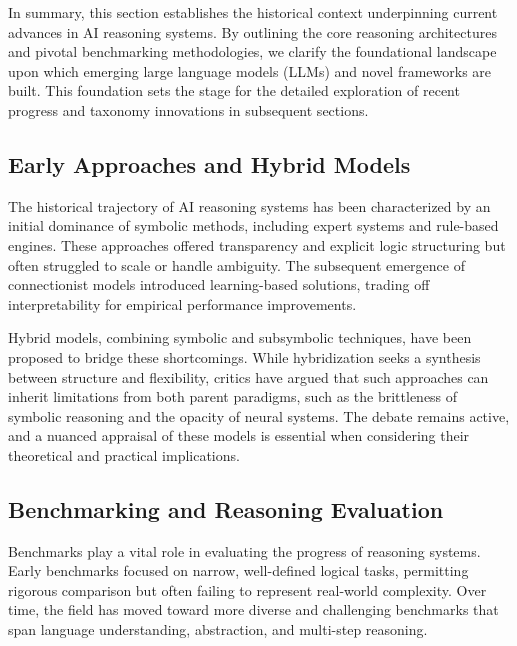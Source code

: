 \documentclass[sigconf]{acmart}
\begin{document}
In summary, this section establishes the historical context underpinning current advances in AI reasoning systems. By outlining the core reasoning architectures and pivotal benchmarking methodologies, we clarify the foundational landscape upon which emerging large language models (LLMs) and novel frameworks are built. This foundation sets the stage for the detailed exploration of recent progress and taxonomy innovations in subsequent sections.

\subsection{Early Approaches and Hybrid Models}
The historical trajectory of AI reasoning systems has been characterized by an initial dominance of symbolic methods, including expert systems and rule-based engines. These approaches offered transparency and explicit logic structuring but often struggled to scale or handle ambiguity. The subsequent emergence of connectionist models introduced learning-based solutions, trading off interpretability for empirical performance improvements.

Hybrid models, combining symbolic and subsymbolic techniques, have been proposed to bridge these shortcomings. While hybridization seeks a synthesis between structure and flexibility, critics have argued that such approaches can inherit limitations from both parent paradigms, such as the brittleness of symbolic reasoning and the opacity of neural systems. The debate remains active, and a nuanced appraisal of these models is essential when considering their theoretical and practical implications.

\subsection{Benchmarking and Reasoning Evaluation}
Benchmarks play a vital role in evaluating the progress of reasoning systems. Early benchmarks focused on narrow, well-defined logical tasks, permitting rigorous comparison but often failing to represent real-world complexity. Over time, the field has moved toward more diverse and challenging benchmarks that span language understanding, abstraction, and multi-step reasoning.
\end{document}
